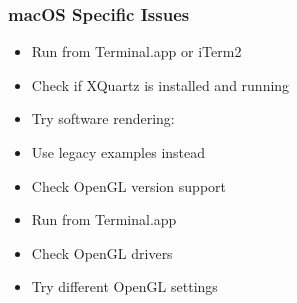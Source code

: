 \documentclass[a4paper,10pt,english,openany,oneside]{sphinxmanual}
\begin{document}
\subsubsection{macOS Specific Issues}
\label{\detokenize{installation:macos-specific-issues}}\begin{description}
\begin{itemize}
\item {} 
\sphinxAtStartPar
Run from Terminal.app or iTerm2

\item {} 
\sphinxAtStartPar
Check if XQuartz is installed and running

\item {} 
\sphinxAtStartPar
Try software rendering: 

\end{itemize}

\begin{itemize}
\item {} 
\sphinxAtStartPar
Use legacy examples instead

\item {} 
\sphinxAtStartPar
Check OpenGL version support

\end{itemize}

\begin{itemize}
\item {} 
\sphinxAtStartPar
Run from Terminal.app

\item {} 
\sphinxAtStartPar
Check OpenGL drivers

\item {} 
\sphinxAtStartPar
Try different OpenGL settings

\end{itemize}

\end{description}
\end{document}
